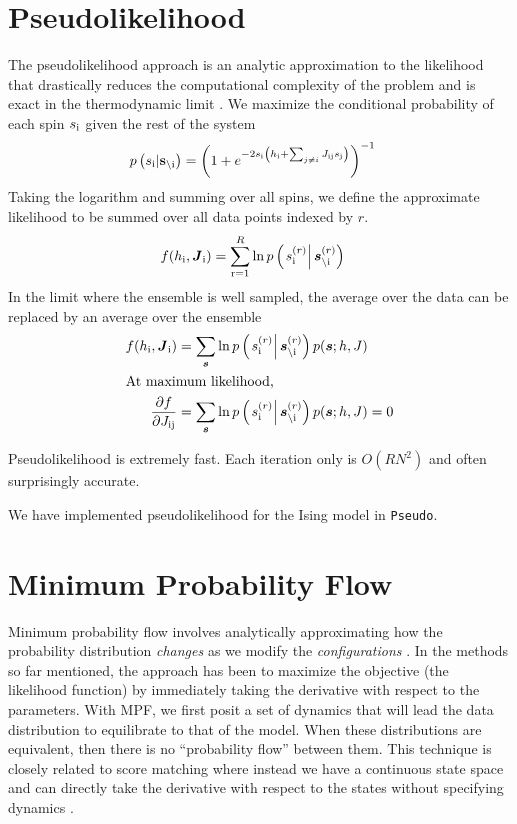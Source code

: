 \documentclass[aps,prl,twocolumn,nofootinbib]{revtex4-1}
\begin{document}
\section{Pseudolikelihood}
The pseudolikelihood approach is an analytic approximation to the likelihood that drastically reduces the computational complexity of the problem and is exact in the thermodynamic limit \cite{Aurell:2012hi}. We maximize the conditional probability of each spin $s_{\rm i}$ given the rest of the system
\begin{align}
	p\left(s_{\rm i}|{\bf s}_{\backslash \rm i}\right) &= \left( 1+e^{-2s_{\rm i} \left(h_{\rm i}+\sum_{j\neq i}J_{\rm ij}s_{\rm j}\right)} \right)^{-1}
\end{align}
Taking the logarithm and summing over all spins, we define the approximate likelihood to be summed over all data points indexed by $r$.
\begin{align}
	f(h_{\rm i},\boldsymbol{J}_{\rm i}) &= \sum_{\rm r=1}^R \ln p\left(\left.s_{\rm i}^{(r)}\right|\boldsymbol{s}_{\backslash\rm i}^{(r)}\right)
\end{align}
In the limit where the ensemble is well sampled, the average over the data can be replaced by an average over the ensemble
\begin{align}
	f(h_{\rm i},\boldsymbol{J}_{\rm i}) &= \sum_{\boldsymbol{s}} \ln p\left(\left.s_{\rm i}^{(r)}\right|\boldsymbol{s}_{\backslash\rm i}^{(r)}\right)p(\boldsymbol{s};h,J)\\
\intertext{At maximum likelihood,}
	\frac{\partial f}{\partial J_{\rm ij}} &= \sum_{\boldsymbol{s}} \ln p\left(\left.s_{\rm i}^{(r)}\right|\boldsymbol{s}_{\backslash\rm i}^{(r)}\right)p(\boldsymbol{s};h,J)=0
\end{align}

Pseudolikelihood is extremely fast. Each iteration only is $O(RN^2)$ and often surprisingly accurate.

We have implemented pseudolikelihood for the Ising model in {\tt Pseudo}.

\section{Minimum Probability Flow}
Minimum probability flow involves analytically approximating how the probability distribution \textit{changes} as we modify the \textit{configurations} \cite{Sohl-Dickstein:2009tt,SohlDickstein:2011im}. In the methods so far mentioned, the approach has been to maximize the objective (the likelihood function) by immediately taking the derivative with respect to the parameters. With MPF, we first posit a set of dynamics that will lead the data distribution to equilibrate to that of the model. When these distributions are equivalent, then there is no ``probability flow'' between them. This technique is closely related to score matching where instead we have a continuous state space and can directly take the derivative with respect to the states without specifying dynamics \cite{Hyvarinen:2007ed}.
\end{document}

